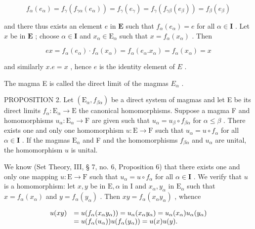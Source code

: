 \[
f _ {\alpha} (e _ {\alpha}) = f _ {\gamma} \left(f _ {\gamma \alpha} (e _ {\alpha})\right) = f _ {\gamma} (e _ {\gamma}) = f _ {\gamma} \left(f _ {\gamma \beta} (e _ {\beta})\right) = f _ {\beta} (e _ {\beta})
\]

and there thus exists an element \(e\) in \(\mathbf{E}\) such that \(f_{\alpha}(e_{\alpha}) = e\) for all \(\alpha \in \mathbf{I}\) . Let \(x\) be in \(\mathbf{E}\) ; choose \(\alpha \in \mathbf{I}\) and \(x_{\alpha} \in \mathrm{E}_{\alpha}\) such that \(x = f_{\alpha}(x_{\alpha})\) . Then

\[
e x = f _ {\alpha} (e _ {\alpha}) \cdot f _ {\alpha} (x _ {\alpha}) = f _ {\alpha} (e _ {\alpha}. x _ {\alpha}) = f _ {\alpha} (x _ {\alpha}) = x
\]

and similarly \(x.e = x\) , hence \(e\) is the identity element of \(E\) .

The magma E is called the direct limit of the magmas \(E_{\alpha}\) .

PROPOSITION 2. Let \((\mathrm{E}_{\alpha}, f_{\beta \alpha})\) be a direct system of magmas and let E be its direct limits \(f_{\alpha} \colon \mathrm{E}_{\alpha} \to \mathrm{E}\) the canonical homomorphisms. Suppose a magma F and homomorphisms \(u_{\alpha} \colon \mathrm{E}_{\alpha} \to \mathrm{F}\) are given such that \(u_{\alpha} = u_{\beta} \circ f_{\beta \alpha}\) for \(\alpha \leqslant \beta\) . There exists one and only one homomorphism \(u \colon \mathrm{E} \to \mathrm{F}\) such that \(u_{\alpha} = u \circ f_{\alpha}\) for all \(\alpha \in \mathbf{I}\) . If the magmas \(\mathrm{E}_{\alpha}\) and F and the homomorphisms \(f_{\beta \alpha}\) and \(u_{\alpha}\) are unital, the homomorphism \(u\) is unital.

We know (Set Theory, III, § 7, no. 6, Proposition 6) that there exists one and only one mapping \(u: \mathrm{E} \to \mathrm{F}\) such that \(u_{\alpha} = u \circ f_{\alpha}\) for all \(\alpha \in \mathbf{I}\) . We verify that \(u\) is a homomorphism: let \(x, y\) be in \(\mathrm{E}, \alpha\) in \(\mathrm{I}\) and \(x_{\alpha}, y_{\alpha}\) in \(\mathrm{E}_{\alpha}\) such that \(x = f_{\alpha}(x_{\alpha})\) and \(y = f_{\alpha}(y_{\alpha})\) . Then \(xy = f_{\alpha}(x_{\alpha}y_{\alpha})\) , whence

\[
\begin{array}{r l} u (x y) & = u (f _ {\alpha} (x _ {\alpha} y _ {\alpha})) = u _ {\alpha} (x _ {\alpha} y _ {\alpha}) = u _ {\alpha} (x _ {\alpha}) u _ {\alpha} (y _ {\alpha}) \\ & = u (f _ {\alpha} (u _ {\alpha})) u (f _ {\alpha} (y _ {\alpha})) = u (x) u (y). \end{array}
\]

